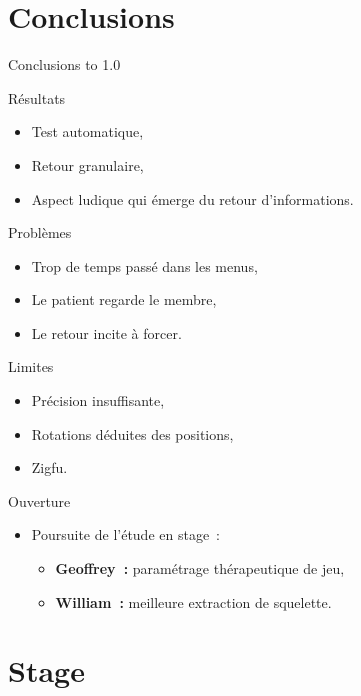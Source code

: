 \section{Conclusions}

\begin{frame}{Conclusions}
\vbox to 1.0\textheight
{
{
  \begin{block}{Résultats}
  \begin{itemize}
  \item Test automatique,
  \item Retour granulaire,
  \item Aspect ludique qui émerge du retour d'informations.
  \end{itemize}
  \end{block}
}
{
  \begin{alertblock}{Problèmes}
  \begin{itemize}
  \item Trop de temps passé dans les menus,
  \item Le patient regarde le membre,
  \item Le retour incite à forcer.
  \end{itemize}
  \end{alertblock}
}
{
  \begin{alertblock}{Limites}
  \begin{itemize}
  \item Précision insuffisante,
  \item Rotations déduites des positions,
  \item Zigfu.
  \end{itemize}
  \end{alertblock}
}
{
  \begin{block}{Ouverture}
  \begin{itemize}
  \item Poursuite de l'étude en stage~:
  \begin{itemize}
  \item \textbf{Geoffrey~:} paramétrage thérapeutique de jeu,
  \item \textbf{William~:} meilleure extraction de squelette. 
  \end{itemize}
  \end{itemize}
  \end{block}
}
\vfill
}
\end{frame}

\section{Stage}

